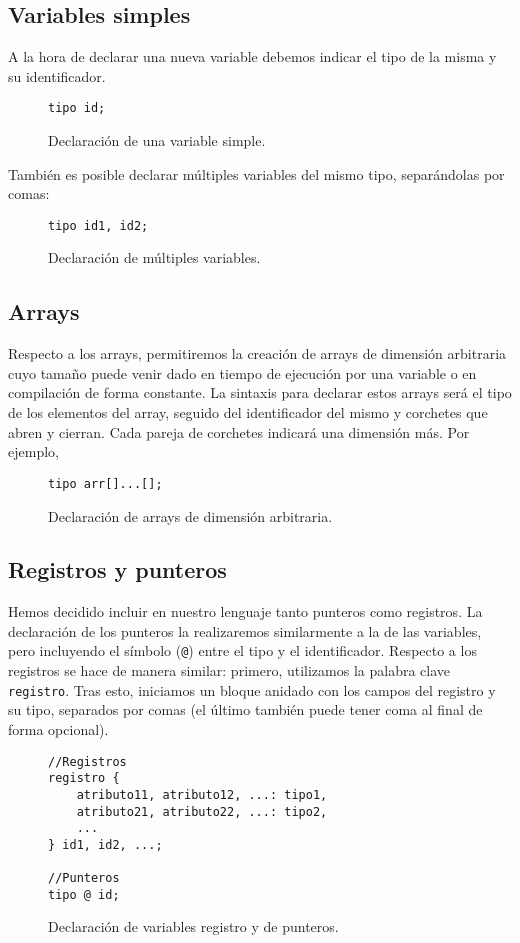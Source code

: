 \subsection*{Variables simples}
A la hora de declarar una nueva variable debemos indicar el tipo de la misma y
su identificador.
\begin{figure}[H]
    \centering
    \begin{lstlisting}
tipo id;
    \end{lstlisting}
    \caption{Declaración de una variable simple.}
\end{figure}
También es posible declarar múltiples variables del mismo tipo, separándolas por
comas:
\begin{figure}[H]
    \centering
    \begin{lstlisting}
tipo id1, id2;
    \end{lstlisting}
    \caption{Declaración de múltiples variables.}
\end{figure}


\subsection*{Arrays}
Respecto a los arrays, permitiremos la creación de arrays de dimensión
arbitraria cuyo tamaño puede venir dado en tiempo de ejecución por una variable
o en compilación de forma constante. La sintaxis para declarar estos arrays será
el tipo de los elementos del array, seguido del identificador del mismo y
corchetes que abren y cierran. Cada pareja de corchetes indicará una dimensión
más. Por ejemplo,
\begin{figure}[H]
    \centering
    \begin{lstlisting}
tipo arr[]...[];
    \end{lstlisting}
    \caption{Declaración de arrays de dimensión arbitraria.}
\end{figure}

\subsection*{Registros y punteros}
Hemos decidido incluir en nuestro lenguaje tanto punteros como registros. La
declaración de los punteros la realizaremos similarmente a la de las variables,
pero incluyendo el símbolo (\lstinline{@}) entre el tipo y el identificador. Respecto a los
registros se hace de manera similar: primero, utilizamos la palabra clave \lstinline{registro}. Tras esto, iniciamos un bloque anidado
con los campos del registro y su tipo, separados por comas (el último también
puede tener coma al final de forma opcional).
\begin{figure}[H]
    \centering
    \begin{lstlisting}
//Registros
registro {
    atributo11, atributo12, ...: tipo1,
    atributo21, atributo22, ...: tipo2,
    ...
} id1, id2, ...;

//Punteros
tipo @ id;
    \end{lstlisting}
    \caption{Declaración de variables registro y de punteros.}
\end{figure}

